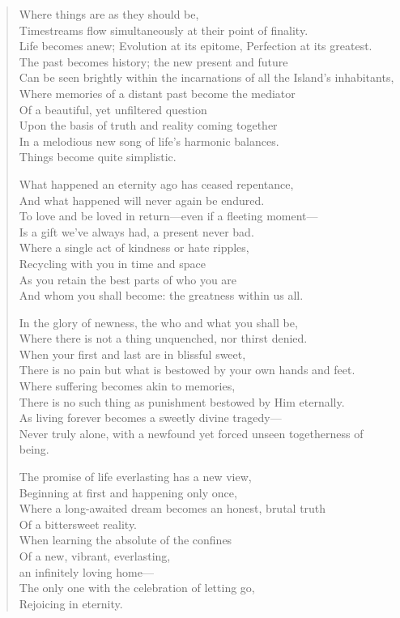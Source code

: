 \documentclass[11pt, letterpaper]{article}
\begin{document}
\begin{verse}
Where things are as they should be,\\
Timestreams flow simultaneously at their point of finality.\\
Life becomes anew; Evolution at its epitome, Perfection at its greatest.\\
The past becomes history; the new present and future\\
Can be seen brightly within the incarnations of all the Island's inhabitants,\\
Where memories of a distant past become the mediator\\
Of a beautiful, yet unfiltered question\\
Upon the basis of truth and reality coming together\\
In a melodious new song of life's harmonic balances.\\
Things become quite simplistic.

What happened an eternity ago has ceased repentance,\\
And what happened will never again be endured.\\
To love and be loved in return---even if a fleeting moment---\\
Is a gift we’ve always had, a present never bad.\\
Where a single act of kindness or hate ripples,\\
Recycling with you in time and space\\
As you retain the best parts of who you are\\
And whom you shall become: the greatness within us all.

In the glory of newness, the who and what you shall be,\\
Where there is not a thing unquenched, nor thirst denied.\\
When your first and last are in blissful sweet,\\
There is no pain but what is bestowed by your own hands and feet.\\
Where suffering becomes akin to memories,\\
There is no such thing as punishment bestowed by Him eternally.\\
As living forever becomes a sweetly divine tragedy---\\
Never truly alone, with a newfound yet forced unseen togetherness of being.

The promise of life everlasting has a new view,\\
Beginning at first and happening only once,\\
Where a long-awaited dream becomes an honest, brutal truth\\
Of a bittersweet reality.\\
When learning the absolute of the confines\\
Of a new, vibrant, everlasting,\\
an infinitely loving home---\\
The only one with the celebration of letting go,\\
Rejoicing in eternity.


\end{verse}
\end{document}

